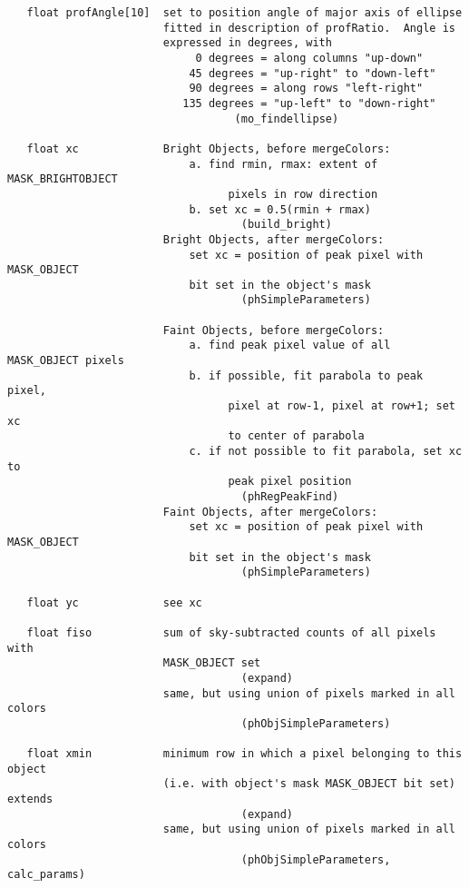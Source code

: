 \begin{verbatim}
   float profAngle[10]  set to position angle of major axis of ellipse
                        fitted in description of profRatio.  Angle is 
                        expressed in degrees, with 
                             0 degrees = along columns "up-down"
                            45 degrees = "up-right" to "down-left"
                            90 degrees = along rows "left-right"
                           135 degrees = "up-left" to "down-right"
                                   (mo_findellipse)

   float xc             Bright Objects, before mergeColors:
                            a. find rmin, rmax: extent of MASK_BRIGHTOBJECT
                                  pixels in row direction
                            b. set xc = 0.5(rmin + rmax)
                                    (build_bright)
                        Bright Objects, after mergeColors:
                            set xc = position of peak pixel with MASK_OBJECT
                            bit set in the object's mask
                                    (phSimpleParameters)

                        Faint Objects, before mergeColors:
                            a. find peak pixel value of all MASK_OBJECT pixels
                            b. if possible, fit parabola to peak pixel,
                                  pixel at row-1, pixel at row+1; set xc
                                  to center of parabola
                            c. if not possible to fit parabola, set xc to
                                  peak pixel position
                                    (phRegPeakFind) 
                        Faint Objects, after mergeColors:
                            set xc = position of peak pixel with MASK_OBJECT
                            bit set in the object's mask
                                    (phSimpleParameters)
                       
   float yc             see xc

   float fiso           sum of sky-subtracted counts of all pixels with 
                        MASK_OBJECT set
                                    (expand)
                        same, but using union of pixels marked in all colors
                                    (phObjSimpleParameters)

   float xmin           minimum row in which a pixel belonging to this object
                        (i.e. with object's mask MASK_OBJECT bit set) extends
                                    (expand)
                        same, but using union of pixels marked in all colors
                                    (phObjSimpleParameters, calc_params)


\end{verbatim}

